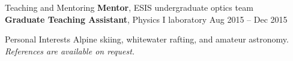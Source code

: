 \documentclass{resume}
\begin{document}
\begin{rSection}{Teaching and Mentoring}
	\textbf{Mentor}, ESIS undergraduate optics team
	\\
	\textbf{Graduate Teaching Assistant}, Physics I laboratory \hfill {\selectfont Aug 2015 -- Dec 2015}
\end{rSection}

\begin{rSection}{Personal Interests}
	Alpine skiing, whitewater rafting, and amateur astronomy. \hfill \textit{References are available on request.}
\end{rSection}
\end{document}
